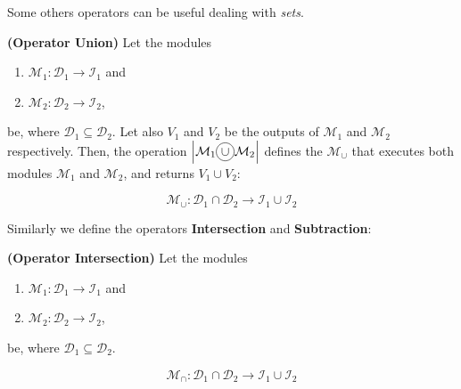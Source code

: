 Some others operators can be useful dealing with {\it sets}.

\begin{definition}\label{op:union}
{\bf (Operator Union)} Let the modules
\begin{enumerate}%
	\item $\mathcal{M}_1 : \mathcal{D}_1 \rightarrow \mathcal{I}_1$ and  
	\item $\mathcal{M}_2 : \mathcal{D}_2 \rightarrow \mathcal{I}_2$,
\end{enumerate}%
be, where $\mathcal{D}_1 \subseteq \mathcal{D}_2$. %
Let also $V_1$ and $V_2$ be the outputs of $\mathcal{M}_1$ and $\mathcal{M}_2$ respectively. Then, the operation $\left|\mathcal{M}_1\circled{$\cup$}\mathcal{M}_2\right|$ defines the \cm{} $\mathcal{M}_{\cup}$ that executes both modules $\mathcal{M}_1$ and $\mathcal{M}_2$, and returns $V_1\cup V_2$:

\[
\mathcal{M}_{\cup}:\mathcal{D}_1\cap\mathcal{D}_2 \rightarrow \mathcal{I}_1 \cup \mathcal{I}_2
\]
\end{definition}

Similarly we define the operators \textbf{Intersection} and \textbf{Subtraction}:

\begin{definition}\label{op:intersec}
{\bf (Operator Intersection)} Let the modules
\begin{enumerate}%
	\item $\mathcal{M}_1 : \mathcal{D}_1 \rightarrow \mathcal{I}_1$ and  
	\item $\mathcal{M}_2 : \mathcal{D}_2 \rightarrow \mathcal{I}_2$,
\end{enumerate}%
be, where $\mathcal{D}_1 \subseteq \mathcal{D}_2$. %

\[
\mathcal{M}_{\cap}:\mathcal{D}_1\cap\mathcal{D}_2 \rightarrow \mathcal{I}_1 \cup \mathcal{I}_2
\]
\end{definition}


